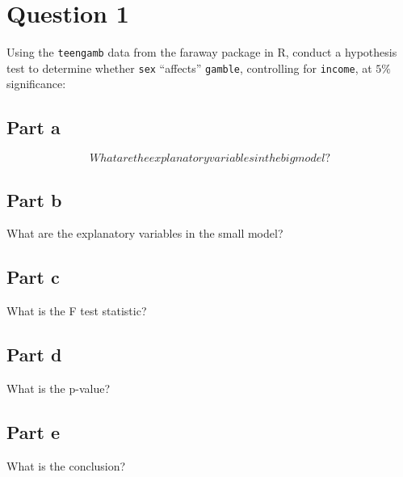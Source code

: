 \section{Question 1}

\begin{question}
    Using the \verb+teengamb+ data from the faraway package in R, conduct a hypothesis test to determine whether \verb+sex+ “affects” \verb+gamble+, controlling for \verb+income+, at $5\%$ significance:
\end{question}

\subsection{Part a}

\begin{equation}
    What are the explanatory variables in the big model?
\end{equation}

\begin{answer}
    
\end{answer}

\subsection{Part b}

\begin{question}
    What are the explanatory variables in the small model?
\end{question}

\begin{answer}
    
\end{answer}

\subsection{Part c}

\begin{question}
    What is the F test statistic?
\end{question}

\begin{answer}
    
\end{answer}

\subsection{Part d}

\begin{question}
    What is the p-value?
\end{question}

\begin{answer}
    
\end{answer}

\subsection{Part e}

\begin{question}
    What is the conclusion?
\end{question}

\begin{answer}
    
\end{answer}
